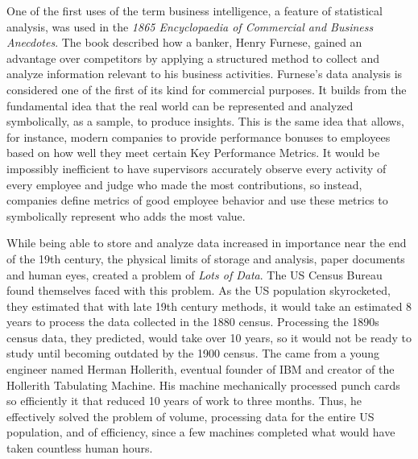 \documentclass[sigconf]{acmart}
\begin{document}
	One of the first uses of the term business intelligence, a feature of statistical analysis, was used in the {\em 1865 Encyclopaedia of Commercial and Business Anecdotes}. The book described how a banker, Henry Furnese, gained an advantage over competitors by applying a structured method to collect and analyze information relevant to his business activities. Furnese's data analysis is considered one of the first of its kind for commercial purposes. It builds from the fundamental idea that the real world can be represented and analyzed symbolically, as a sample, to produce insights.\cite{Data_History} This is the same idea that allows, for instance, modern companies to provide performance bonuses to employees based on how well they meet certain Key Performance Metrics. It would be impossibly inefficient to have supervisors accurately observe every activity of every employee and judge who made the most contributions, so instead, companies define metrics of good employee behavior and use these metrics to symbolically represent who adds the most value.

	While being able to store and analyze data increased in importance near the end of the 19th century, the physical limits of storage and analysis, paper documents and human eyes, created a problem of {\em Lots of Data}. The US Census Bureau found themselves faced with this problem. As the US population skyrocketed, they estimated that with late 19th century methods, it would take an estimated 8 years to process the data collected in the 1880 census. Processing the 1890s census data, they predicted, would take over 10 years, so it would not be ready to study until becoming outdated by the 1900 census. The came from a young engineer named Herman Hollerith, eventual founder of IBM and creator of the Hollerith Tabulating Machine. His machine mechanically processed punch cards so efficiently it that reduced 10 years of work to three months.\cite{Data_History} Thus, he effectively solved the problem of volume, processing data for the entire US population, and of efficiency, since a few machines completed what would have taken countless human hours.
\end{document}
